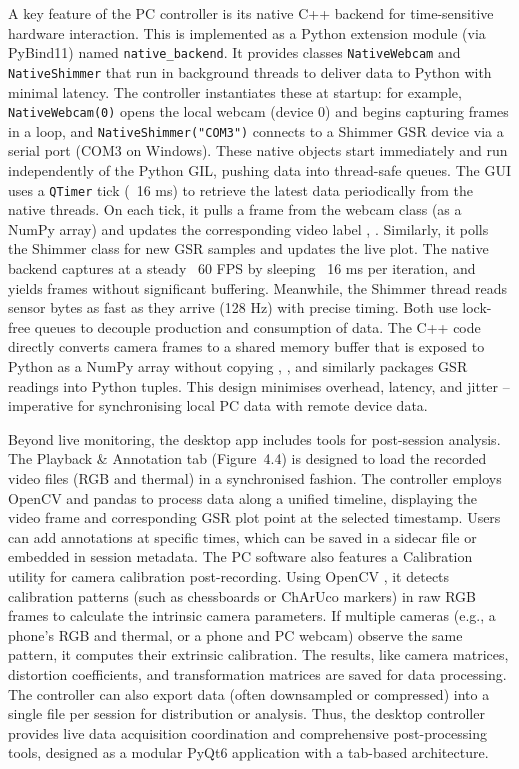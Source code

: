 A key feature of the PC controller is its native C++ backend for time-sensitive hardware interaction. This is implemented as a Python extension module (via PyBind11) \cite{ref18} named \texttt{native\_backend}. It provides classes \texttt{NativeWebcam} and \texttt{NativeShimmer} that run in background threads to deliver data to Python with minimal latency. The controller instantiates these at startup: for example, \texttt{NativeWebcam(0)} opens the local webcam (device 0) and begins capturing frames in a loop, and \texttt{NativeShimmer("COM3")} connects to a Shimmer GSR device via a serial port (COM3 on Windows). These native objects start immediately and run independently of the Python GIL, pushing data into thread-safe queues. The GUI uses a \texttt{QTimer} tick (~16 ms) to retrieve the latest data periodically from the native threads. On each tick, it pulls a frame from the webcam class (as a NumPy array) and updates the corresponding video label \cite{ref1}, \cite{ref2}. Similarly, it polls the Shimmer class for new GSR samples and updates the live plot. The native backend captures at a steady ~60 FPS by sleeping ~16 ms per iteration, and yields frames without significant buffering. Meanwhile, the Shimmer thread reads sensor bytes as fast as they arrive (128 Hz) with precise timing. Both use lock-free queues to decouple production and consumption of data. The C++ code directly converts camera frames to a shared memory buffer that is exposed to Python as a NumPy array without copying \cite{ref1}, \cite{ref2}, and similarly packages GSR readings into Python tuples. This design minimises overhead, latency, and jitter -- imperative for synchronising local PC data with remote device data.

Beyond live monitoring, the desktop app includes tools for post-session analysis. The Playback \& Annotation tab (Figure~4.4) is designed to load the recorded video files (RGB and thermal) in a synchronised fashion. The controller employs OpenCV and pandas to process data along a unified timeline, displaying the video frame and corresponding GSR plot point at the selected timestamp. Users can add annotations at specific times, which can be saved in a sidecar file or embedded in session metadata. The PC software also features a Calibration utility for camera calibration post-recording. Using OpenCV \cite{ref22}, it detects calibration patterns (such as chessboards or ChArUco markers) in raw RGB frames to calculate the intrinsic camera parameters. If multiple cameras (e.g., a phone’s RGB and thermal, or a phone and PC webcam) observe the same pattern, it computes their extrinsic calibration. The results, like camera matrices, distortion coefficients, and transformation matrices are saved for data processing. The controller can also export data (often downsampled or compressed) into a single file per session for distribution or analysis. Thus, the desktop controller provides live data acquisition coordination and comprehensive post-processing tools, designed as a modular PyQt6 application with a tab-based architecture.

